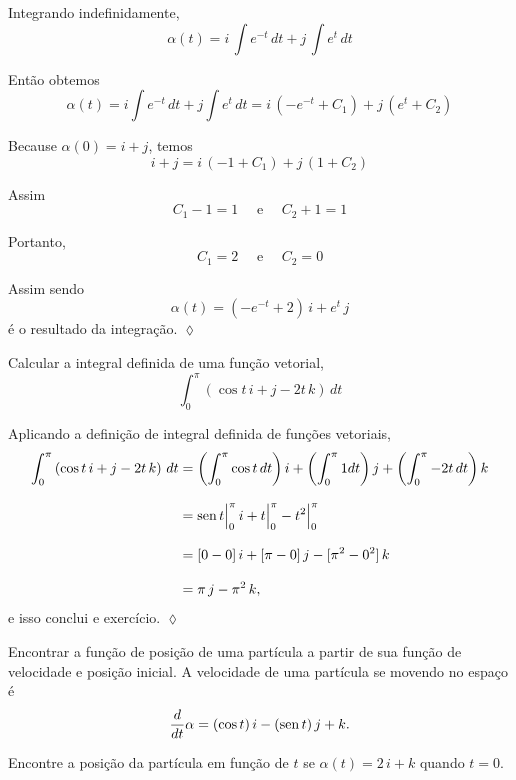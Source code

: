 \solo
Integrando indefinidamente,
\begin{equation*}
\alpha(t) = i\,\int e^{-t}\, dt + j\,\int e^{t}\, dt
\end{equation*}

Então obtemos
\begin{equation*}
\alpha(t) = i\int e^{-t}\,dt +j \int e^{t}\,dt =i\, (-e^{-t}+C_{1}) + j\,(e^{t} + C_{2})
\end{equation*}

Because \(\alpha(0) = i + j\), temos
\begin{equation*}
i + j = i\,(-1 + C_{1}) + j\,(1 +C_{2})
\end{equation*}

Assim
\begin{equation*}
C_{1}-1 = 1 \quad \text{ e } \quad  C_{2} + 1 = 1
\end{equation*}

Portanto,
\begin{equation*}
C_{1} = 2 \quad \text{ e } \quad  C_{2} = 0
\end{equation*}

Assim sendo
\begin{equation*}
\alpha(t) = (-e^{-t} + 2)\,i + e^{t}\,j
\end{equation*}
é o resultado da integração. \hfill $\lozenge$

\begin{exc}
Calcular a integral definida de uma função vetorial,
\begin{equation*}
\int_{0}^{\pi} \left( \cos t\, i+j-2t\, k \right)\, dt
\end{equation*}
\end{exc}

\solo
Aplicando a definição de integral definida de funções vetoriais,
\begin{align*}
\int_{0}^{\pi} \left( \cos t\, i+j-2t\, k \right)\, dt &= \left(\int_{0}^{\pi} \cos t\, dt\right)i+\left(\int_{0}^{\pi} 1 dt\right)j+
\left(\int_{0}^{\pi} -2t\, dt\right)k  \\[2ex]
&=\operatorname{sen} t\Big|_{0}^{\pi}\, i +t\Big|_{0}^{\pi}-t^{2}\Big|_{0}^{\pi}\\[2ex]
&=[0-0]\,i+[\pi -0]\, j-[\pi^{2}-0^{2}]\, k\\[2ex]
&=\pi\,j-\pi^{2}\,k,
\end{align*}
e isso conclui e exercício. \hfill $\lozenge$

\begin{exc}
Encontrar a função de posição de uma partícula a partir de sua função de velocidade e posição inicial.
A velocidade de uma partícula se movendo no espaço é
\begin{equation*}
\frac{d}{dt}\alpha =(\cos t)\, i-(\operatorname{sen} t)\, j + k.
\end{equation*}

Encontre a posição da partícula em função de $t$ se $\alpha(t)=2\,i+k$ quando $t=0$.
\end{exc}

